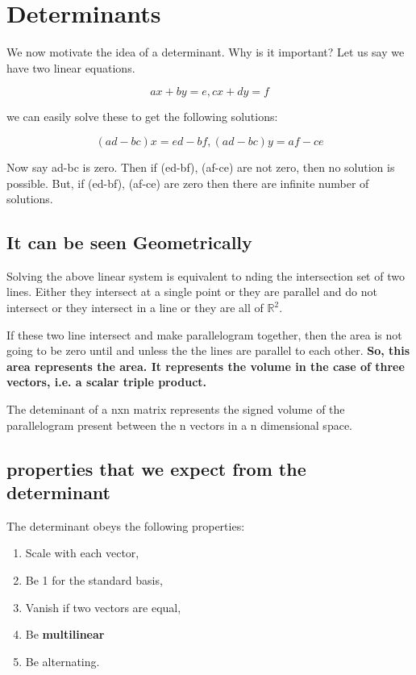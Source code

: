 \section{Determinants}

We now motivate the idea of a determinant. Why is it important? Let us say we have two linear equations. 

$$ax +by = e, cx +dy = f$$

we can easily solve these to get the following solutions:

$$(ad - bc)x = ed - bf , (ad - bc)y = af - ce$$

Now say ad-bc is zero. Then if (ed-bf), (af-ce) are not zero, then no solution is possible. But, if (ed-bf), (af-ce) are zero then there are infinite number of solutions. 

\subsection{It can be seen Geometrically}

Solving the above linear system is equivalent to nding the
intersection set of two lines. Either they intersect at a single point or they are parallel and
do not intersect or they intersect in a line or they are all of $\mathbb{R}^2$.

If these two line intersect and make parallelogram together, then the area is not going to be zero until and unless the the lines are parallel to each other. \textbf{So, this area represents the area. It represents the volume in the case of three vectors, i.e. a scalar triple product.}

\begin{outline}
    The deteminant of a nxn matrix represents the signed volume of the parallelogram present between the n vectors in a n dimensional space.  
\end{outline}

\subsection{properties that we expect from the determinant}

The determinant obeys the following properties:

\begin{enumerate}
    \item Scale with each vector,
    \item Be 1 for the standard basis,
    \item Vanish if two vectors are equal,
    \item Be \textbf{multilinear}
    \item Be alternating.
\end{enumerate}

